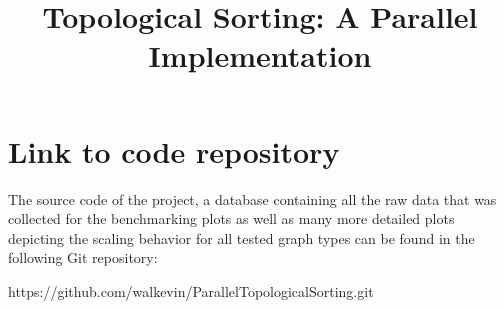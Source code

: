 \documentclass[letterpaper]{article}
\title{Topological Sorting: A Parallel Implementation}
\begin{document}
\maketitle








\section{Link to code repository}
%
The source code of the project, a database containing all the raw data that was collected for the benchmarking plots as well as many more detailed plots depicting the scaling behavior for all tested graph types can be found in the following Git repository:
\begin{center}
	https://github.com/walkevin/ParallelTopologicalSorting.git
\end{center}




\end{document}
